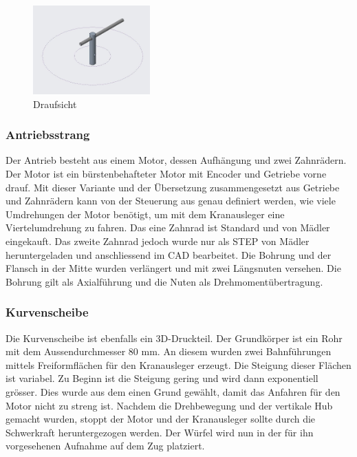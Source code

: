\documentclass[../../main.tex]{subfiles}
\begin{document}
        \begin{figure}[H]
            \centering
            \includegraphics[width=0.4\textwidth]{../../images/Kran/Top.JPG}
            \caption {Draufsicht}
        \end{figure}



    \subsubsection{Antriebsstrang}
        Der Antrieb besteht aus einem Motor, dessen Aufhängung und zwei Zahnrädern. Der Motor ist ein bürstenbehafteter
        Motor mit Encoder und Getriebe vorne drauf. Mit dieser Variante und der Übersetzung zusammengesetzt aus Getriebe
        und Zahnrädern kann von der Steuerung aus genau definiert werden, wie viele Umdrehungen der Motor benötigt, um
        mit dem Kranausleger eine Viertelumdrehung zu fahren. Das eine Zahnrad ist Standard und von Mädler eingekauft.
        Das zweite Zahnrad jedoch wurde nur als STEP von Mädler heruntergeladen und anschliessend im CAD bearbeitet. Die
        Bohrung und der Flansch in der Mitte wurden verlängert und mit zwei Längsnuten versehen. Die Bohrung gilt als
        Axialführung und die Nuten als Drehmomentübertragung.


        \subsubsection{Kurvenscheibe}
        Die Kurvenscheibe ist ebenfalls ein 3D-Druckteil. Der Grundkörper ist ein Rohr mit dem Aussendurchmesser 80 mm. An diesem wurden zwei Bahnführungen mittels Freiformflächen für den Kranausleger erzeugt. Die Steigung dieser Flächen ist variabel. Zu Beginn ist die Steigung gering und wird dann exponentiell grösser. Dies wurde aus dem einen Grund gewählt, damit das Anfahren für den Motor nicht zu streng ist. Nachdem die Drehbewegung und der vertikale Hub gemacht wurden, stoppt der Motor und der Kranausleger sollte durch die Schwerkraft heruntergezogen werden. Der Würfel wird nun in der für ihn vorgesehenen Aufnahme auf dem Zug platziert.
\end{document}
